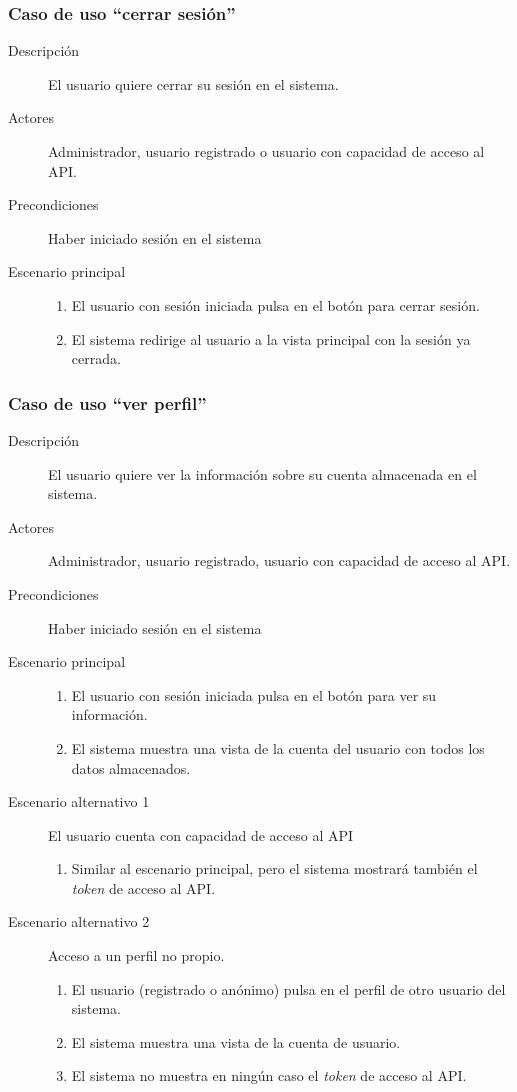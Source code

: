 \subsubsection{Caso de uso ``cerrar sesión''}
\begin{description}
\item[Descripción] 			El usuario quiere cerrar su sesión en el sistema.
\item[Actores] 				Administrador, usuario registrado o usuario con capacidad de acceso al API.
\item[Precondiciones]  		Haber iniciado sesión en el sistema
\item[Escenario principal] 	\hfill
						 	\begin{enumerate}
							\item El usuario con sesión iniciada pulsa en el botón para cerrar sesión.
							\item El sistema redirige al usuario a la vista principal con la sesión ya cerrada.
							\end{enumerate}							
\end{description}


\subsubsection{Caso de uso ``ver perfil''}
\begin{description}
\item[Descripción] 			El usuario quiere ver la información sobre su cuenta almacenada en el sistema.
\item[Actores] 				Administrador, usuario registrado, usuario con capacidad de acceso al API.
\item[Precondiciones]  		Haber iniciado sesión en el sistema
\item[Escenario principal] 	\hfill
						 	\begin{enumerate}
							\item El usuario con sesión iniciada pulsa en el botón para ver su información.
							\item El sistema muestra una vista de la cuenta del usuario con todos los datos almacenados.
							\end{enumerate}
\item[Escenario alternativo 1] El usuario cuenta con capacidad de acceso al API
							\begin{enumerate}
							\item Similar al escenario principal, pero el sistema mostrará también el \textit{token} de acceso al API.
							\end{enumerate}
\item [Escenario alternativo 2] Acceso a un perfil no propio.
							\begin{enumerate}
							\item El usuario (registrado o anónimo) pulsa en el perfil de otro usuario del sistema.
							\item El sistema muestra una vista de la cuenta de usuario.
							\item El sistema no muestra en ningún caso el \textit{token} de acceso al API.
							\end{enumerate}							
\end{description}


